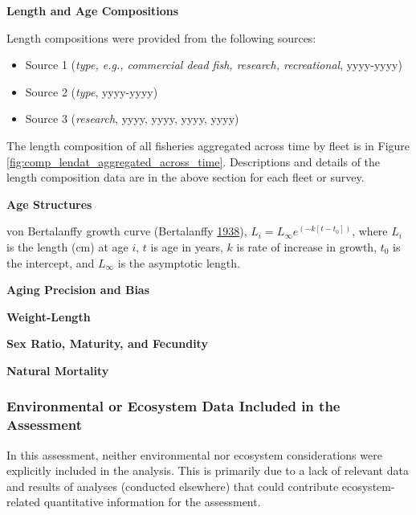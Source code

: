 \documentclass[12pt,]{article}
\begin{document}
\textbf{Length and Age Compositions}

Length compositions were provided from the following sources:

\begin{itemize}[noitemsep,nolistsep,topsep=0pt]
  \item Source 1 (\emph{type, e.g., commercial dead fish, research, recreational}, yyyy-yyyy)    
  \item Source 2 (\emph{type}, yyyy-yyyy)    
  \item Source 3 (\emph{research}, yyyy, yyyy, yyyy, yyyy) 
\end{itemize}

The length composition of all fisheries aggregated across time by fleet
is in Figure \ref{fig:comp_lendat_aggregated_across_time}. Descriptions
and details of the length composition data are in the above section for
each fleet or survey.

\vspace{.5cm} \textbf{Age Structures}

von Bertalanffy growth curve (Bertalanffy
\protect\hyperlink{ref-vonB1938}{1938}),
\(L_i = L_{\infty}e^{(-k[t-t_0])}\), where \(L_i\) is the length (cm) at
age \(i\), \(t\) is age in years, \(k\) is rate of increase in growth,
\(t_0\) is the intercept, and \(L_{\infty}\) is the asymptotic length.

\vspace{.5cm} \textbf{Aging Precision and Bias}

\vspace{.5cm} \textbf{Weight-Length}

\vspace{.5cm} \textbf{Sex Ratio, Maturity, and Fecundity}

\vspace{.5cm} \textbf{Natural Mortality}

\vspace{.5cm}

\subsubsection{Environmental or Ecosystem Data Included in the
Assessment}\label{environmental-or-ecosystem-data-included-in-the-assessment}

In this assessment, neither environmental nor ecosystem considerations
were explicitly included in the analysis. This is primarily due to a
lack of relevant data and results of analyses (conducted elsewhere) that
could contribute ecosystem-related quantitative information for the
assessment.
\end{document}
